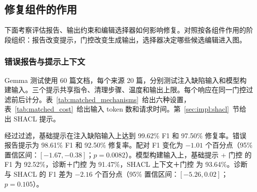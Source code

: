 \subsection{修复组件的作用}
\label{sec:eval:router}
\label{sec:eval:mechanisms}

下面考察评估报告、输出约束和编辑选择器如何影响修复。对照按各组件作用的阶段组织：报告改变提示，门控改变生成输出，选择器决定哪些候选编辑进入图。

\subsubsection{错误报告与提示上下文}

Gemma 测试使用 60 篇文档，每个来源 20 篇，分别测试注入缺陷输入和模型构建输入。三个提示共享指令、清理步骤、温度和输出上限。每个响应在同一门控过滤前后计分。表~\ref{tab:matched_mechanisms}~给出六种设置，表~\ref{tab:matched_cost}~给出输入 token 数和请求时间。第~\ref{sec:impl:shacl}~节给出 SHACL 提示。

\begin{table}[t]
\centering
\caption{Gemma 提示测试，每组输入 60 篇文档。每个原始／过滤对照使用同一响应。}
\label{tab:matched_mechanisms}
\small
{}
\end{table}

经过过滤，基础提示在注入缺陷输入上达到 99.62\% F1 和 97.50\% 修复率。错误报告提示为 98.61\% F1 和 92.50\% 修复率。配对 F1 变化为 $-1.01$ 个百分点（95\% 置信区间：$[-1.67,-0.38]$；$p=0.0082$）。模型构建输入上，基础提示 + 门控 的 F1 为 92.52\%，诊断＋门控 为 91.47\%，SHACL 上下文＋门控 为 93.64\%。诊断 与 SHACL 的 F1 差为 $-2.16$ 个百分点（95\% 置信区间：$[-5.26,0.02]$；$p=0.105$）。

